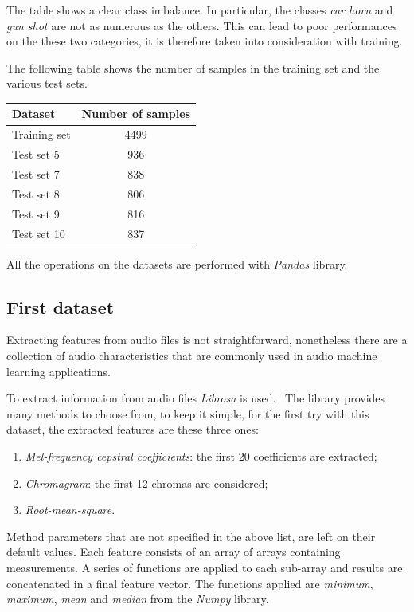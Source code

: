 The table shows a clear class imbalance. In particular, the classes 
\emph{car horn} and \emph{gun shot} are not as numerous as the others. 
This can lead to poor performances on the these two categories, it is
therefore taken 
into consideration with training. 

The following table shows the number of samples in the training set and 
the various test sets.

\begin{center}
    \begin{tabular}{ |l|c| } 
        \hline
        Dataset & Number of samples \\
        \hline
        Training set & 4499 \\
        Test set 5 & 936 \\
        Test set 7 & 838 \\
        Test set 8 & 806 \\
        Test set 9 & 816 \\
        Test set 10 & 837 \\
        \hline
    \end{tabular}
\end{center}
All the operations on the datasets are performed with \emph{Pandas} library.~\cite{pandas}

\subsection{First dataset}
\label{first}
Extracting features from audio files is not straightforward, nonetheless there 
are a collection of audio characteristics that are commonly used in audio machine learning 
applications.~\cite{features}

To extract information from audio files \emph{Librosa} is used.~\cite{librosa}
The library provides many methods to choose from,
to keep it simple, for the first try with this dataset, the extracted features 
are these three ones: 
\begin{enumerate}
    \item \emph{Mel-frequency cepstral coefficients}: the first 20 coefficients 
    are extracted;
    \item \emph{Chromagram}: the first 12 chromas are considered;
    \item \emph{Root-mean-square}.
\end{enumerate}
Method parameters that are not specified in the above list, are left on their default values.
Each feature consists of an array of arrays containing measurements. 
A series of functions are applied to each sub-array and results 
are concatenated in a final feature vector. 
The functions applied are \emph{minimum}, \emph{maximum}, \emph{mean} 
and \emph{median} from the \emph{Numpy} library.~\cite{numpy}

